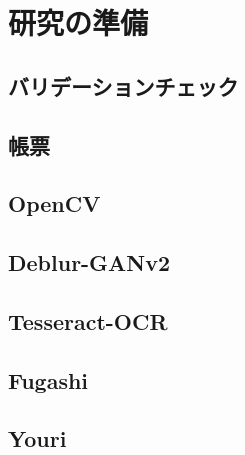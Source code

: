 \chapter{研究の準備}\label{cha:Preparation}



\section{バリデーションチェック}\label{sec:validation_check}


\section{帳票}\label{sec:ledger}


\section{OpenCV}\label{sec:OpenCV}


\section{Deblur-GANv2}\label{sec:Deblur-GANv2}


\section{Tesseract-OCR}\label{sec:Tesseract-OCR}


\section{Fugashi}\label{sec:Fugashi}


\section{Youri}\label{sec:Youri}
